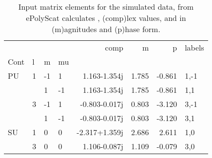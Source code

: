 \begin{table}

\begin{tabular}{llllrrrl}
\toprule
   &   &    &    &          comp &     m &      p & labels \\
Cont & l & m & mu &               &       &        &        \\
\midrule
PU & 1 & -1 &  1 &  1.163-1.354j & 1.785 & -0.861 &   1,-1 \\
   &   &  1 & -1 &  1.163-1.354j & 1.785 & -0.861 &    1,1 \\
   & 3 & -1 &  1 & -0.803-0.017j & 0.803 & -3.120 &   3,-1 \\
   &   &  1 & -1 & -0.803-0.017j & 0.803 & -3.120 &    3,1 \\
SU & 1 &  0 &  0 & -2.317+1.359j & 2.686 &  2.611 &    1,0 \\
   & 3 &  0 &  0 &  1.106-0.087j & 1.109 & -0.079 &    3,0 \\
\bottomrule
\end{tabular}

\caption{\label{tab:matE}Input matrix elements for the simulated data, from ePolyScat calculates , (comp)lex values, and in (m)agnitudes and (p)hase form.}
\end{table}